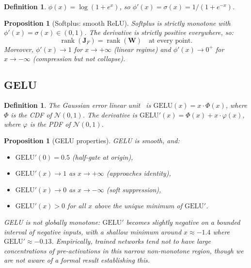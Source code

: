 \documentclass[11pt,a4paper]{article}
\newtheorem{proposition}[theorem]{Proposition}
\newtheorem{definition}[theorem]{Definition}
\theoremstyle{remark}
\begin{document}
\begin{definition}
$\phi(x) = \log(1 + e^x)$, so $\phi'(x) = \sigma(x) = 1/(1 + e^{-x})$.
\end{definition}

\begin{proposition}[Softplus: smooth ReLU]
\label{prop:softplus}
Softplus is strictly monotone with $\phi'(x) = \sigma(x) \in (0, 1)$.
The derivative is strictly positive everywhere, so:
\[
  \operatorname{rank}(\mathbf{J}_F) = \operatorname{rank}(\mathbf{W}) \quad \text{at every point}.
\]
Moreover, $\phi'(x) \to 1$ for $x \to +\infty$ (linear regime) and $\phi'(x) \to 0^+$ for $x \to -\infty$ (compression but not collapse).
\end{proposition}

\subsection{GELU}

\begin{definition}
The Gaussian error linear unit~\cite{hendrycks2016gelu} is $\mathrm{GELU}(x) = x \cdot \Phi(x)$, where $\Phi$ is the CDF of $\mathcal{N}(0,1)$.
The derivative is $\mathrm{GELU}'(x) = \Phi(x) + x \cdot \varphi(x)$, where $\varphi$ is the PDF of $\mathcal{N}(0,1)$.
\end{definition}

\begin{proposition}[GELU properties]
\label{prop:gelu}
GELU is smooth, and:
\begin{itemize}
  \item $\mathrm{GELU}'(0) = 0.5$ (half-gate at origin),
  \item $\mathrm{GELU}'(x) \to 1$ as $x \to +\infty$ (approaches identity),
  \item $\mathrm{GELU}'(x) \to 0$ as $x \to -\infty$ (soft suppression),
  \item $\mathrm{GELU}'(x) > 0$ for all $x$ above the unique minimum of $\mathrm{GELU}'$.
\end{itemize}
GELU is not globally monotone: $\mathrm{GELU}'$ becomes slightly negative on a bounded interval of negative inputs, with a shallow minimum around $x \approx -1.4$ where $\mathrm{GELU}' \approx -0.13$.
Empirically, trained networks tend not to have large concentrations of pre-activations in this narrow non-monotone region, though we are not aware of a formal result establishing this.
\end{proposition}
\end{document}
